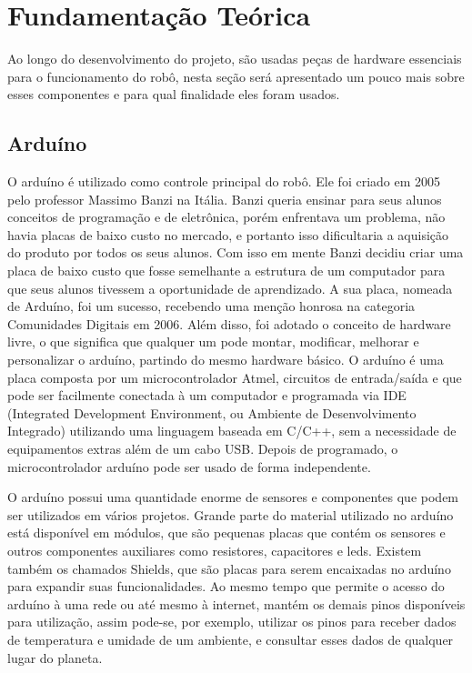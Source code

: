 \chapter{Fundamentação Teórica}
    Ao longo do desenvolvimento do projeto, são usadas peças de hardware essenciais para o funcionamento do robô, nesta seção será apresentado um pouco mais sobre esses componentes e para qual finalidade eles foram usados.

\section{ Arduíno}

O arduíno é utilizado como controle principal do robô. Ele foi criado em 2005 pelo professor Massimo Banzi na Itália. Banzi queria ensinar para seus alunos conceitos de programação e de eletrônica, porém enfrentava um problema, não havia placas de baixo custo no mercado, e portanto isso dificultaria a aquisição do produto por todos os seus alunos. Com isso em mente Banzi decidiu criar uma placa de baixo custo que fosse semelhante a estrutura de um computador para que seus alunos tivessem a oportunidade de aprendizado. A sua placa, nomeada de Arduíno, foi um sucesso, recebendo uma menção honrosa na categoria Comunidades Digitais em 2006. Além disso, foi adotado o conceito de hardware livre, o que significa que qualquer um pode montar, modificar, melhorar e personalizar o arduíno, partindo do mesmo hardware básico. O arduíno é uma placa composta por um microcontrolador Atmel, circuitos de entrada/saída e que pode ser facilmente conectada à um computador e programada via IDE (Integrated Development Environment, ou Ambiente de Desenvolvimento Integrado) utilizando uma linguagem baseada em C/C++, sem a necessidade de equipamentos extras além de um cabo USB. Depois de programado, o microcontrolador arduíno pode ser usado de forma independente.\cite{arduinowiki}

    O arduíno possui uma quantidade enorme de sensores e componentes que podem ser utilizados em vários projetos. Grande parte do material utilizado no arduíno está disponível em módulos, que são pequenas placas que contém os sensores e outros componentes auxiliares como resistores, capacitores e leds. Existem também os chamados Shields, que são placas para serem encaixadas no arduíno para expandir suas funcionalidades. Ao mesmo tempo que permite o acesso do arduíno à uma rede ou até mesmo à internet, mantém os demais pinos disponíveis para utilização, assim pode-se, por exemplo, utilizar os pinos para receber dados de temperatura e umidade de um ambiente, e consultar esses dados de qualquer lugar do planeta.\cite{arduinowiki}
    
